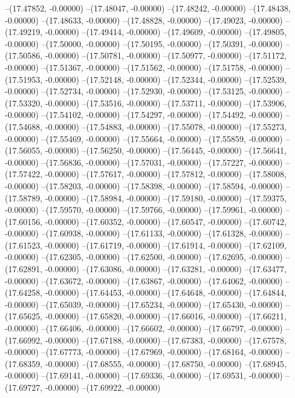 --(17.47852, -0.00000)
--(17.48047, -0.00000)
--(17.48242, -0.00000)
--(17.48438, -0.00000)
--(17.48633, -0.00000)
--(17.48828, -0.00000)
--(17.49023, -0.00000)
--(17.49219, -0.00000)
--(17.49414, -0.00000)
--(17.49609, -0.00000)
--(17.49805, -0.00000)
--(17.50000, -0.00000)
--(17.50195, -0.00000)
--(17.50391, -0.00000)
--(17.50586, -0.00000)
--(17.50781, -0.00000)
--(17.50977, -0.00000)
--(17.51172, -0.00000)
--(17.51367, -0.00000)
--(17.51562, -0.00000)
--(17.51758, -0.00000)
--(17.51953, -0.00000)
--(17.52148, -0.00000)
--(17.52344, -0.00000)
--(17.52539, -0.00000)
--(17.52734, -0.00000)
--(17.52930, -0.00000)
--(17.53125, -0.00000)
--(17.53320, -0.00000)
--(17.53516, -0.00000)
--(17.53711, -0.00000)
--(17.53906, -0.00000)
--(17.54102, -0.00000)
--(17.54297, -0.00000)
--(17.54492, -0.00000)
--(17.54688, -0.00000)
--(17.54883, -0.00000)
--(17.55078, -0.00000)
--(17.55273, -0.00000)
--(17.55469, -0.00000)
--(17.55664, -0.00000)
--(17.55859, -0.00000)
--(17.56055, -0.00000)
--(17.56250, -0.00000)
--(17.56445, -0.00000)
--(17.56641, -0.00000)
--(17.56836, -0.00000)
--(17.57031, -0.00000)
--(17.57227, -0.00000)
--(17.57422, -0.00000)
--(17.57617, -0.00000)
--(17.57812, -0.00000)
--(17.58008, -0.00000)
--(17.58203, -0.00000)
--(17.58398, -0.00000)
--(17.58594, -0.00000)
--(17.58789, -0.00000)
--(17.58984, -0.00000)
--(17.59180, -0.00000)
--(17.59375, -0.00000)
--(17.59570, -0.00000)
--(17.59766, -0.00000)
--(17.59961, -0.00000)
--(17.60156, -0.00000)
--(17.60352, -0.00000)
--(17.60547, -0.00000)
--(17.60742, -0.00000)
--(17.60938, -0.00000)
--(17.61133, -0.00000)
--(17.61328, -0.00000)
--(17.61523, -0.00000)
--(17.61719, -0.00000)
--(17.61914, -0.00000)
--(17.62109, -0.00000)
--(17.62305, -0.00000)
--(17.62500, -0.00000)
--(17.62695, -0.00000)
--(17.62891, -0.00000)
--(17.63086, -0.00000)
--(17.63281, -0.00000)
--(17.63477, -0.00000)
--(17.63672, -0.00000)
--(17.63867, -0.00000)
--(17.64062, -0.00000)
--(17.64258, -0.00000)
--(17.64453, -0.00000)
--(17.64648, -0.00000)
--(17.64844, -0.00000)
--(17.65039, -0.00000)
--(17.65234, -0.00000)
--(17.65430, -0.00000)
--(17.65625, -0.00000)
--(17.65820, -0.00000)
--(17.66016, -0.00000)
--(17.66211, -0.00000)
--(17.66406, -0.00000)
--(17.66602, -0.00000)
--(17.66797, -0.00000)
--(17.66992, -0.00000)
--(17.67188, -0.00000)
--(17.67383, -0.00000)
--(17.67578, -0.00000)
--(17.67773, -0.00000)
--(17.67969, -0.00000)
--(17.68164, -0.00000)
--(17.68359, -0.00000)
--(17.68555, -0.00000)
--(17.68750, -0.00000)
--(17.68945, -0.00000)
--(17.69141, -0.00000)
--(17.69336, -0.00000)
--(17.69531, -0.00000)
--(17.69727, -0.00000)
--(17.69922, -0.00000)
